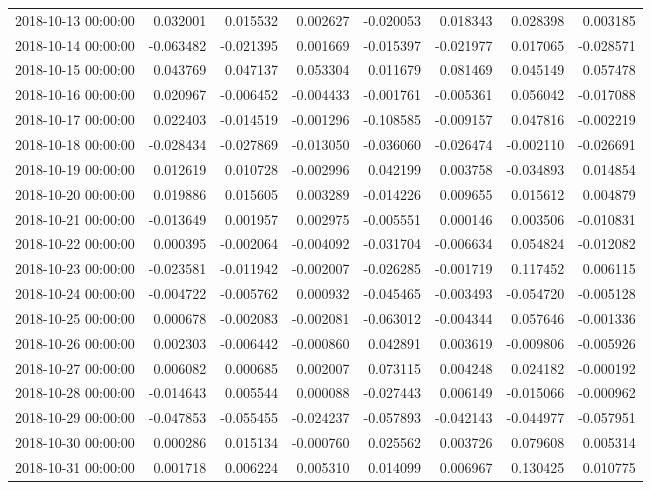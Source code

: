 \begin{tabular}{lrrrrrrr}
2018-10-13 00:00:00 & 0.032001 & 0.015532 & 0.002627 & -0.020053 & 0.018343 & 0.028398 & 0.003185 \\
2018-10-14 00:00:00 & -0.063482 & -0.021395 & 0.001669 & -0.015397 & -0.021977 & 0.017065 & -0.028571 \\
2018-10-15 00:00:00 & 0.043769 & 0.047137 & 0.053304 & 0.011679 & 0.081469 & 0.045149 & 0.057478 \\
2018-10-16 00:00:00 & 0.020967 & -0.006452 & -0.004433 & -0.001761 & -0.005361 & 0.056042 & -0.017088 \\
2018-10-17 00:00:00 & 0.022403 & -0.014519 & -0.001296 & -0.108585 & -0.009157 & 0.047816 & -0.002219 \\
2018-10-18 00:00:00 & -0.028434 & -0.027869 & -0.013050 & -0.036060 & -0.026474 & -0.002110 & -0.026691 \\
2018-10-19 00:00:00 & 0.012619 & 0.010728 & -0.002996 & 0.042199 & 0.003758 & -0.034893 & 0.014854 \\
2018-10-20 00:00:00 & 0.019886 & 0.015605 & 0.003289 & -0.014226 & 0.009655 & 0.015612 & 0.004879 \\
2018-10-21 00:00:00 & -0.013649 & 0.001957 & 0.002975 & -0.005551 & 0.000146 & 0.003506 & -0.010831 \\
2018-10-22 00:00:00 & 0.000395 & -0.002064 & -0.004092 & -0.031704 & -0.006634 & 0.054824 & -0.012082 \\
2018-10-23 00:00:00 & -0.023581 & -0.011942 & -0.002007 & -0.026285 & -0.001719 & 0.117452 & 0.006115 \\
2018-10-24 00:00:00 & -0.004722 & -0.005762 & 0.000932 & -0.045465 & -0.003493 & -0.054720 & -0.005128 \\
2018-10-25 00:00:00 & 0.000678 & -0.002083 & -0.002081 & -0.063012 & -0.004344 & 0.057646 & -0.001336 \\
2018-10-26 00:00:00 & 0.002303 & -0.006442 & -0.000860 & 0.042891 & 0.003619 & -0.009806 & -0.005926 \\
2018-10-27 00:00:00 & 0.006082 & 0.000685 & 0.002007 & 0.073115 & 0.004248 & 0.024182 & -0.000192 \\
2018-10-28 00:00:00 & -0.014643 & 0.005544 & 0.000088 & -0.027443 & 0.006149 & -0.015066 & -0.000962 \\
2018-10-29 00:00:00 & -0.047853 & -0.055455 & -0.024237 & -0.057893 & -0.042143 & -0.044977 & -0.057951 \\
2018-10-30 00:00:00 & 0.000286 & 0.015134 & -0.000760 & 0.025562 & 0.003726 & 0.079608 & 0.005314 \\
2018-10-31 00:00:00 & 0.001718 & 0.006224 & 0.005310 & 0.014099 & 0.006967 & 0.130425 & 0.010775 \\

\end{tabular}
